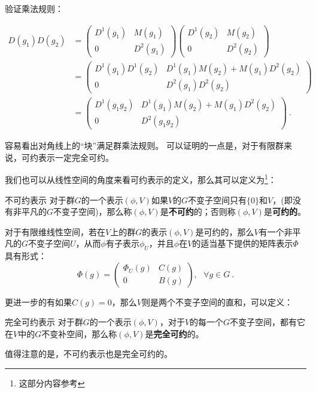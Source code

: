 验证乘法规则：

\begin{align}
D(g_1)D(g_2)&=
\begin{pmatrix}
 D^1(g_1) & M(g_1)\\
 0 & D^2(g_1)
\end{pmatrix}
\begin{pmatrix}
 D^1(g_2) & M(g_2)\\
 0 & D^2(g_2)
\end{pmatrix} \\
&=\begin{pmatrix}
 D^1(g_1)D^1(g_2) & D^1(g_1)M(g_2)+M(g_1)D^2(g_2)\\
 0 & D^2(g_1)D^2(g_2)
\end{pmatrix} \\
&=\begin{pmatrix}
 D^1(g_1g_2) & D^1(g_1)M(g_2)+M(g_1)D^2(g_2)\\
 0 & D^2(g_1g_2)
\end{pmatrix}~.
\end{align}

容易看出对角线上的“块”满足群乘法规则。
可以证明的一点是，对于有限群来说，可约表示一定完全可约。







我们也可以从线性空间的角度来看可约表示的定义，那么其可以定义为\footnote{这部分内容参考\cite{维声表示}}：

\begin{definition}{不可约表示}
对于群$G$的一个表示$(\phi,V)$如果$V$的$G$不变子空间只有$\{0\}$和$V$，(即没有非平凡的$G$不变子空间)，那么称$(\phi,V)$是\textbf{不可约}的；否则称$(\phi,V)$是\textbf{可约的}。
\end{definition}

\begin{definition}{}
对于有限维线性空间，若在$V$上的群$G$的表示$(\phi,V)$是可约的，那么$V$有一个非平凡的$G$不变子空间$U$，从而$\phi$有子表示$\phi_U$，并且$\phi$在$V$的适当基下提供的矩阵表示$\Phi$具有形式：
$$\Phi(g)=\begin{pmatrix}
 \Phi_U(g) & C(g)\\
 0 & B(g)
\end{pmatrix},~~~\forall g\in G~.$$

\end{definition}

更进一步的有如果$C(g)=0$，那么$V$则是两个不变子空间的直和，可以定义：
\begin{definition}{完全可约表示}
对于群$G$的一个表示$(\phi,V)$，对于$V$的每一个$G$不变子空间，都有它在$V$中的$G$不变补空间，那么称$(\phi,V)$是\textbf{完全可约}的。
\end{definition}

值得注意的是，不可约表示也是完全可约的。












